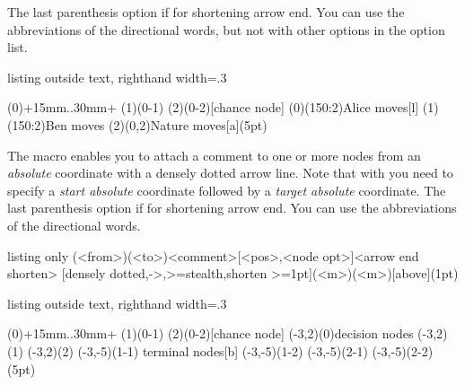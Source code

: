 The last parenthesis option if for shortening arrow end.
You can use the abbreviations of the directional words, but not with other options in the option list.

\begin{tcblisting}{listing outside text, righthand width=.3\linewidth}
\begin{istgame}[->,scale=.7]
\xtShowEndPoints
\istroot(0)+15mm..30mm+       \istb \istb \endist
\istroot(1)(0-1)              \istb \istb \endist
\istroot(2)(0-2)[chance node] \istb \istb \endist
{}(0)(150:2){Alice moves}[l]
(1)(150:2){Ben moves}
(2)(0,2){Nature moves}[a](5pt)
\end{istgame}
\end{tcblisting}

The macro \icmd{\xtCommentFrom} enables you to attach a comment to one or more nodes from an \emph{absolute} coordinate with a densely dotted arrow line.
Note that with \cmd{\xtCommentFrom} you need to specify a \emph{start absolute} coordinate followed by a \emph{target absolute} coordinate.
The last parenthesis option if for shortening arrow end.
You can use the abbreviations of the directional words.

\begin{tcblisting}{listing only}
  (<from>)(<to>){<comment>}[<pos>,<node opt>]<arrow end shorten>
  [densely dotted,->,>=stealth,shorten >=1pt](<m>)(<m>){}[above](1pt)
\end{tcblisting}


\begin{tcblisting}{listing outside text, righthand width=.3\linewidth}
\begin{istgame}[scale=.6]
\xtShowEndPoints
\istroot(0)+15mm..30mm+
  \istb \istb \endist
\istroot(1)(0-1)
  \istb \istb \endist
\istroot(2)(0-2)[chance node]
  \istb \istb \endist
{}(-3,2)(0){decision nodes}
(-3,2)(1)
(-3,2)(2)
(-3,-5)(1-1)
              {terminal nodes}[b]
(-3,-5)(1-2)
(-3,-5)(2-1)
(-3,-5)(2-2)(5pt)
\end{istgame}
\end{tcblisting}

